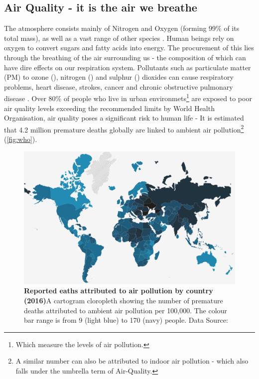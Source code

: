 \subsection{Air Quality - it is the air we breathe}\label{sec:airq}
The atmosphere consists mainly of Nitrogen and Oxygen (forming 99\% of its total mass), as well as a vast range of other species \citep{ac}. Human beings rely on oxygen to convert sugars and fatty acids into energy. The procurement of this lies through the breathing of the air surrounding us - the composition of which can have dire effects on our respiration system. Pollutants such as particulate matter (PM) to ozone (), nitrogen () and sulphur () dioxides can cause respiratory problems, heart disease, strokes, cancer and chronic obstructive pulmonary disease \cite{who}. Over 80\% of people who live in urban environmets\footnote{Which measure the levels of air pollution.} are exposed to poor air quality levels exceeding the recommended limits by World Health Organisation, air quality poses a significant risk to human life - It is estimated that 4.2 million premature deaths globally are linked to ambient air pollution\footnote{A similar number can also be attributed to indoor air pollution - which also falls under the umbrella term of Air-Quality.} (\autoref{fig:who}).


\begin{figure}[H]
  \centering
  \includegraphics[width=\textwidth]{who.png}
  \caption{\textbf{Reported eaths attributed to air pollution by country (2016)}A cartogram cloropleth showing the number of premature deaths attributed to ambient air pollution per 100,000. The colour bar range is from 9 (light blue) to 170 (navy) people.  Data Source:\citep{whodata}}
  \label{fig:who}
\end{figure}

